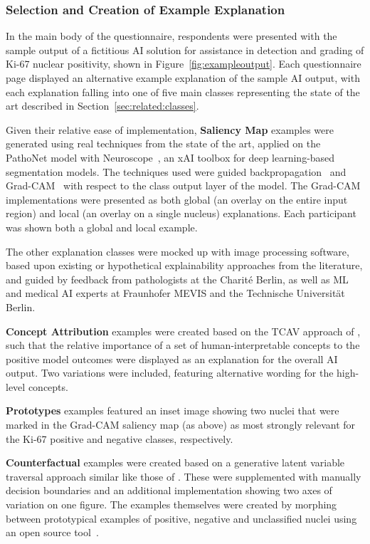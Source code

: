 \subsubsection{Selection and Creation of Example Explanation}

In the main body of the questionnaire, respondents were presented with the sample output of a fictitious AI solution for assistance in detection and grading of Ki-67 nuclear positivity,  shown in Figure~\ref{fig:exampleoutput}. Each questionnaire page displayed an alternative example explanation of the sample AI output, with each explanation falling into one of five main classes representing the state of the art described in Section~\ref{sec:related:classes}.

Given their relative ease of implementation, \textbf{Saliency Map} examples were generated using real techniques from the state of the art, applied on the PathoNet model with Neuroscope~\cite{schorr_neuroscope_2021}, an xAI toolbox for deep learning-based segmentation models. The techniques used were guided backpropagation~\cite{springenberg2014striving} and Grad-CAM~\cite{selvaraju2017grad} with respect to the class output layer of the model. The Grad-CAM implementations were presented as both global (an overlay on the entire input region) and local (an overlay on a single nucleus) explanations. Each participant was shown both a global and local example.

The other explanation classes were mocked up with image processing software, based upon existing or hypothetical explainability approaches from the literature, and guided by feedback from pathologists at the Charité Berlin, as well as ML and medical AI experts at Fraunhofer MEVIS and the Technische Universität Berlin.

\textbf{Concept Attribution} examples were created based on the TCAV approach of \citet{kim2018interpretability}, such that the relative importance of a set of human-interpretable concepts to the positive model outcomes were displayed as an explanation for the overall AI output. Two variations were included, featuring alternative wording for the high-level concepts. 

\textbf{Prototypes} examples featured an inset image showing two nuclei that were marked in the Grad-CAM saliency map (as above) as most strongly relevant for the Ki-67 positive and negative classes, respectively.

\textbf{Counterfactual} examples were created based on a generative latent variable traversal approach similar like those of \citet{liu2019generative}. These were supplemented with manually decision boundaries and an additional implementation showing two axes of variation on one figure. The examples themselves were created by morphing between prototypical examples of positive, negative and unclassified nuclei using an open source tool~\cite{diffmorph:github}.


